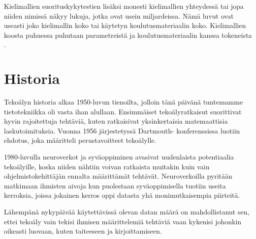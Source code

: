 Kielimallien suorituskykytestien lisäksi monesti kielimallien yhteydessä tai
jopa niiden nimissä näkyy lukuja, jotka ovat usein miljardeissa. Nämä luvut
ovat useasti joko kielimallin koko tai käytetyn koulutusmateriaalin koko.
Kielimallien koosta puhuessa puhutaan parametreistä ja koulutusmateriaalin
kanssa tokeneista \parencite{kaplan2020scalinglawsneurallanguage}.

\section{Historia}

Tekoälyn historia alkaa 1950-luvun tienoilta, jolloin tänä päivänä tuntemamme
tietotekniikka oli vasta ihan alullaan. Ensimmäiset tekoälyratkaisut
suorittivat hyvin rajoitettuja tehtäviä, kuten ratkaisivat yksinkertaisia
matemaattisia laskutoimituksia. Vuonna 1956 järjestetyssä Dartmouth-
konferenssissa luotiin ehdotus, joka määritteli perustavoitteet tekoälylle.
\parencite{alma9911564814005973}

1980-luvulla neuroverkot ja syväoppiminen avasivat uudenlaista potentiaalia
tekoälyille, koska niiden nähtiin voivan ratkaista muitakin kuin vain
ohjelmistokehittäjän ennalta määrittämät tehtävät. Neuroverkoilla pyritään
matkimaan ihmisten aivoja kun puolestaan syväoppimisella tuotiin useita
kerroksia, joissa jokainen kerros oppi datasta yhä monimutkaisempia piirteitä.
\parencite{alma9911564814005973}

Lähempänä nykypäivää käytettävissä olevan datan määrä on mahdollistanut sen,
ettei tekoäly vain tekisi ihmisen määrittelemiä tehtäviä vaan kykenisi johonkin
oikeasti luovaan, kuten taiteeseen ja kirjoittamiseen.
\parencite{alma9911564814005973}
